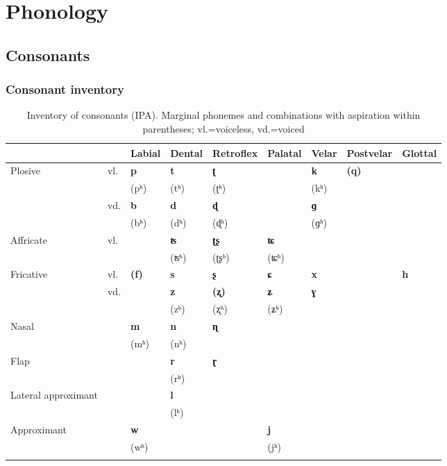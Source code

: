 \chapter{Phonology}
\label{chap:3}

\section{Consonants}
\label{sec:3-1}

\subsection{Consonant inventory}


\begin{table}[ht]
\caption{Inventory of consonants (IPA). Marginal phonemes and combinations with aspiration within parentheses; vl.=voiceless, vd.=voiced}
\begin{tabularx}{\textwidth}{ P{20mm} Q Q Q Q Q Q Q Q }
\lsptoprule
&
&
La\-bi\-al &
Den\-tal &
Retro\-flex &
Pa\-la\-tal &
Ve\-lar &
Post\-velar &
Glot\-tal \\\hline
Plo\-sive &
vl. &
\textbf{p} &
\textbf{t} &
\textbf{ʈ} &
&
\textbf{k} &
\textbf{(q)} &
\\
&
&
(pʰ) &
(tʰ) &
(ʈʰ) &
&
(kʰ) &
&
\\
&
vd. &
\textbf{b} &
\textbf{d} &
\textbf{ɖ} &
&
\textbf{ɡ} &
&
\\
&
&
(bʰ) &
(dʰ) &
(ɖʰ) &
&
(ɡʰ) &
&
\\
Affricate &
vl. &
&
\textbf{ʦ} &
\textbf{ʈʂ} &
\textbf{ʨ} &
&
&
\\
&
&
&
(ʦʰ) &
(ʈʂʰ) &
(ʨʰ) &
&
&
\\
Fricative &
vl. &
\textbf{(f)} &
\textbf{s} &
\textbf{ʂ} &
\textbf{ɕ} &
\textbf{x} &
&
\textbf{h}\\
&
vd. &
&
\textbf{z} &
\textbf{(ʐ)} &
\textbf{ʑ} &
\textbf{ɣ} &
&
\\
&
&
&
(zʰ) &
(ʐʰ) &
(ʑʰ) &
&
&
\\
Nasal &
&
\textbf{m} &
\textbf{n} &
\textbf{ɳ} &
&
&
&
\\
&
&
(mʰ) &
(nʰ) &
&
&
&
&
\\
Flap &
&
&
\textbf{r} &
\textbf{ɽ} &
&
&
&
\\
&
&
&
(rʰ) &
&
&
&
&
\\
Lateral approximant &
&
&
\textbf{l} &
&
&
&
&
\\
&
&
&
(lʰ) &
&
&
&
&
\\
Approximant &
&
\textbf{w} &
&
&
\textbf{j} &
&
&
\\
&
&
(wʰ) &
&
&
(jʰ) &
&
&
\\\lspbottomrule
\end{tabularx}
\label{tab:3-1}
\end{table}


